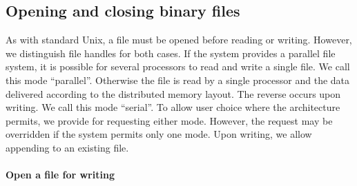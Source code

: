 \documentclass{article}
\begin{document}
\subsection{Opening and closing binary files}

As with standard Unix, a file must be opened before reading or
writing.  However, we distinguish file handles for both cases.  If the
system provides a parallel file system, it is possible for several
processors to read and write a single file. We call this mode
``parallel''.  Otherwise the file is read by a single processor and
the data delivered according to the distributed memory layout.  The
reverse occurs upon writing. We call this mode ``serial''. To allow
user choice where the architecture permits, we provide for requesting
either mode.  However, the request may be overridden if the system
permits only one mode.  Upon writing, we allow appending to an
existing file.

\paragraph{Open a file for writing}
\end{document}
